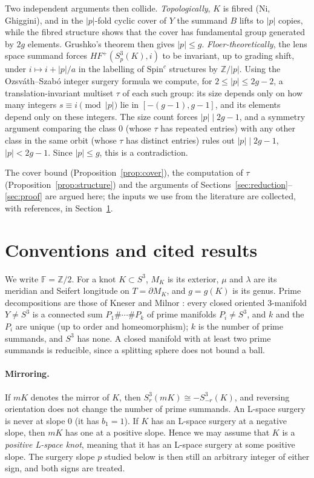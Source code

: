 \documentclass[11pt]{article}
\theoremstyle{definition}
\newcommand{\F}{\mathbb{F}}
\newcommand{\Z}{\mathbb{Z}}
\newcommand{\HFp}{\mathit{HF}^+}
\newcommand{\Spinc}{\mathrm{Spin}^c}
\begin{document}
Two independent arguments then collide. \emph{Topologically}, $K$ is fibred (Ni, Ghiggini), and in the $|p|$-fold cyclic cover of $Y$ the summand $B$ lifts to $|p|$ copies, while the fibred structure shows that the cover has fundamental group generated by $2g$ elements. Grushko's theorem then gives $|p|\le g$. \emph{Floer-theoretically}, the lens space summand forces $\HFp(S^3_p(K),i)$ to be invariant, up to grading shift, under $i\mapsto i+|p|/a$ in the labelling of $\Spinc$ structures by $\Z/|p|$. Using the Ozsv\'ath--Szab\'o integer surgery formula we compute, for $2\le |p|\le 2g-2$, a translation-invariant multiset $\tau$ of each such group: its size depends only on how many integers $s\equiv i \pmod{|p|}$ lie in $[-(g-1),g-1]$, and its elements depend only on these integers. The size count forces $|p|\mid 2g-1$, and a symmetry argument comparing the class $0$ (whose $\tau$ has repeated entries) with any other class in the same orbit (whose $\tau$ has distinct entries) rules out $|p|\mid 2g-1$, $|p|<2g-1$. Since $|p|\le g$, this is a contradiction.

The cover bound (Proposition~\ref{prop:cover}), the computation of $\tau$ (Proposition~\ref{prop:structure}) and the arguments of Sections~\ref{sec:reduction}--\ref{sec:proof} are argued here; the inputs we use from the literature are collected, with references, in Section~\ref{sec:cited}.

\section{Conventions and cited results}\label{sec:cited}

We write $\F=\Z/2$. For a knot $K\subset S^3$, $M_K$ is its exterior, $\mu$ and $\lambda$ are its meridian and Seifert longitude on $T=\partial M_K$, and $g=g(K)$ is its genus. Prime decompositions are those of Kneser and Milnor \cite{Kneser,Milnor}: every closed oriented $3$-manifold $Y\ne S^3$ is a connected sum $P_1\#\cdots\# P_k$ of prime manifolds $P_i\ne S^3$, and $k$ and the $P_i$ are unique (up to order and homeomorphism); $k$ is the number of prime summands, and $S^3$ has none. A closed manifold with at least two prime summands is reducible, since a splitting sphere does not bound a ball.

\paragraph{Mirroring.} If $mK$ denotes the mirror of $K$, then $S^3_r(mK)\cong -S^3_{-r}(K)$, and reversing orientation does not change the number of prime summands. An L-space surgery is never at slope $0$ (it has $b_1=1$). If $K$ has an L-space surgery at a negative slope, then $mK$ has one at a positive slope. Hence we may assume that $K$ is a \emph{positive L-space knot}, meaning that it has an L-space surgery at some positive slope. The surgery slope $p$ studied below is then still an arbitrary integer of either sign, and both signs are treated.
\end{document}
